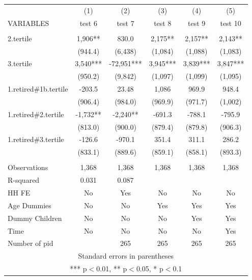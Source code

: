 \begin{tabular}{lccccc} \hline
 & (1) & (2) & (3) & (4) & (5) \\
VARIABLES & test 6 & test 7 & test 8 & test 9 & test 10 \\ \hline
 &  &  &  &  &  \\
2.tertile & 1,906** & 830.0 & 2,175** & 2,157** & 2,143** \\
 & (944.4) & (6,438) & (1,084) & (1,088) & (1,083) \\
3.tertile & 3,540*** & -72,951*** & 3,945*** & 3,839*** & 3,847*** \\
 & (950.2) & (9,842) & (1,097) & (1,099) & (1,095) \\
1.retired\#1b.tertile & -203.5 & 23.48 & 1,086 & 969.9 & 948.4 \\
 & (906.4) & (984.0) & (969.9) & (971.7) & (1,002) \\
1.retired\#2.tertile & -1,732** & -2,240** & -691.3 & -788.1 & -795.9 \\
 & (813.0) & (900.0) & (879.4) & (879.8) & (906.3) \\
1.retired\#3.tertile & -126.6 & -970.1 & 351.4 & 311.1 & 286.2 \\
 & (833.1) & (889.6) & (859.1) & (858.1) & (893.3) \\
 &  &  &  &  &  \\
Observations & 1,368 & 1,368 & 1,368 & 1,368 & 1,368 \\
R-squared & 0.031 & 0.087 &  &  &  \\
HH FE & No & Yes & No & No & No \\
Age Dummies & No & No & Yes & Yes & Yes \\
Dummy Children & No & No & No & Yes & Yes \\
Time & No & No & No & No & Yes \\
 Number of pid &  & 265 & 265 & 265 & 265 \\ \hline
\multicolumn{6}{c}{ Standard errors in parentheses} \\
\multicolumn{6}{c}{ *** p$<$0.01, ** p$<$0.05, * p$<$0.1} \\
\end{tabular}
